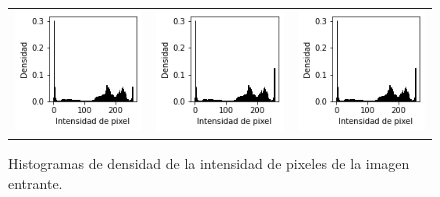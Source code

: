 \begin{figure}[!b]
\begin{tabular}{ccc}
        \includegraphics[width=4cm]{../Plots/THR/threshold_input_12.png} &
        \includegraphics[width=4cm]{../Plots/THR/threshold_input_13.png} &
        \includegraphics[width=4cm]{../Plots/THR/threshold_input_14.png} \\

    \end{tabular}        
    \caption{Histogramas de densidad de la intensidad de pixeles de la imagen entrante.}
    \label{fig:thresh_input_1}
\end{figure}

